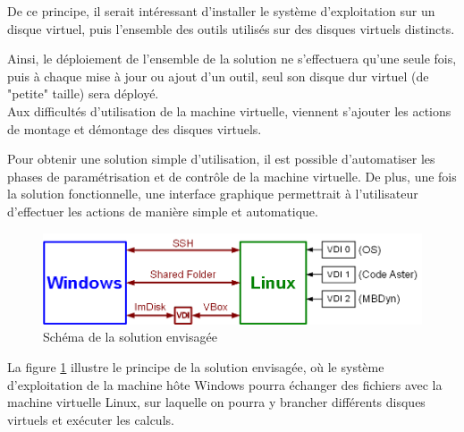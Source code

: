 De ce principe, il serait intéressant d'installer le système d'exploitation sur un disque virtuel, puis l'ensemble des outils utilisés sur des disques virtuels distincts.

Ainsi, le déploiement de l'ensemble de la solution ne s'effectuera qu'une seule fois, puis à chaque mise à jour ou ajout d'un outil, seul son disque dur virtuel (de "petite" taille) sera déployé.
\\


Aux difficultés d'utilisation de la machine virtuelle, viennent s'ajouter les actions de montage et démontage des disques virtuels.

Pour obtenir une solution simple d'utilisation, il est possible d'automatiser les phases de paramétrisation et de contrôle de la machine virtuelle.
De plus, une fois la solution fonctionnelle, une interface graphique permettrait à l'utilisateur d'effectuer les actions de manière simple et automatique.
\\


\begin{figure}[!h]
	\center
	\includegraphics[scale=0.5]{img/Solution_envisagee.png}
	\caption{Schéma de la solution envisagée}
	\label{Schéma Solution envisagée}
\end{figure}

La figure \ref{Schéma Solution envisagée} illustre le principe de la solution envisagée, où le système d'exploitation de la machine hôte Windows pourra échanger des fichiers avec la machine virtuelle Linux, sur laquelle on pourra y brancher différents disques virtuels et exécuter les calculs.